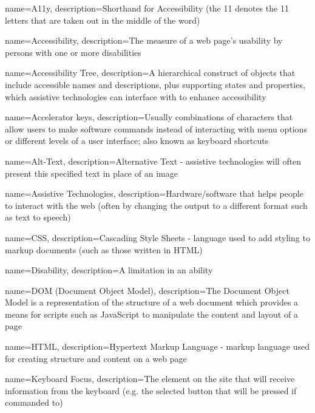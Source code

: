 {
    name=A11y,
    description={Shorthand for Accessibility (the 11 denotes the 11 letters that are taken out in the middle of the word)}
}

{
    name=Accessibility,
    description={The measure of a web page's usability by persons with one or more disabilities}
}

{
    name=Accessibility Tree,
    description={A hierarchical construct of objects that include accessible names and descriptions, plus supporting states and properties, which assistive technologies can interface with to enhance accessibility}
}

{
    name=Accelerator keys,
    description={Usually combinations of characters that allow users to make software commands instead of interacting with menu options or different levels of a user interface; also known as keyboard shortcuts}
}

{
    name=Alt-Text,
    description={Alternative Text - assistive technologies will often present this specified text in place of an image}
}

{
    name=Assistive Technologies,
    description={Hardware/software that helps people to interact with the web (often by changing the output to a different format such as text to speech)}
}

{
    name=CSS,
    description={Cascading Style Sheets - language used to add styling to markup documents (such as those written in HTML)}
}

{
    name=Disability,
    description={A limitation in an ability}
}

{
    name=DOM (Document Object Model),
    description={The Document Object Model is a representation of the structure of a web document which provides a means for scripts such as JavaScript to manipulate the content and layout of a page}
}

{
    name=HTML,
    description={Hypertext Markup Language - markup language used for creating structure and content on a web page}
}

{
    name=Keyboard Focus,
    description={The element on the site that will receive information from the keyboard (e.g. the selected button that will be pressed if commanded to)}
}

